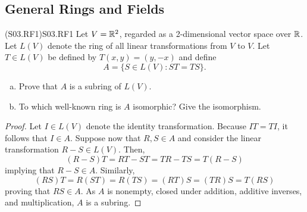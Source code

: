 \documentclass[../../AlgebraQualSolutions.tex]{subfiles}
\begin{document}
\subsection{General Rings and Fields}

\begin{prob}{(S03.RF1)}{S03.RF1}
    Let $V = \mathbb{R}^2$, regarded as a 2-dimensional vector space over $\mathbb{R}$. Let $L(V)$ denote the ring of all linear transformations from $V$ to $V$. Let $T \in L(V)$ be defined by $T(x,y) = (y,-x)$ and define
        \[A = \{S \in L(V): ST = TS\}.\]
    \begin{enumerate}[(a)]
        \item Prove that $A$ is a subring of $L(V)$.
        \item To which well-known ring is $A$ isomorphic? Give the isomorphism.
    \end{enumerate}
\end{prob}

\begin{proof}
    Let $I \in L(V)$ denote the identity transformation. Because $IT = TI$, it follows that $I \in A$. Suppose now that $R,S \in A$ and consider the linear transformation $R - S \in L(V)$. Then,
        \[(R-S)T = RT -ST = TR - TS = T(R - S)\]
    implying that $R - S \in A$. Similarly,
        \[(RS)T = R(ST) = R(TS) = (RT)S = (TR)S = T(RS)\]
    proving that $RS \in A$. As $A$ is nonempty, closed under addition, additive inverses, and multiplication, $A$ is a subring.
\end{proof}
\end{document}
